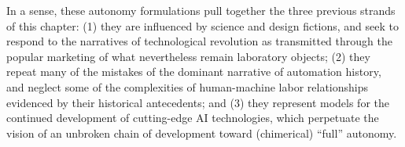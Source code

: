 







In a sense, these autonomy
formulations pull together the three previous strands of this
chapter: (1) they are influenced by science and design fictions, and seek
to respond to the narratives of technological revolution as
transmitted through the popular marketing of what nevertheless remain laboratory
objects; (2) they repeat many of the mistakes of the dominant narrative of
automation history, and neglect some of the complexities of
human-machine labor relationships evidenced by their historical
antecedents; and (3) they represent models for the
continued development of cutting-edge AI technologies, which perpetuate
the vision of an unbroken chain of development toward
(chimerical) ``full'' autonomy. 



